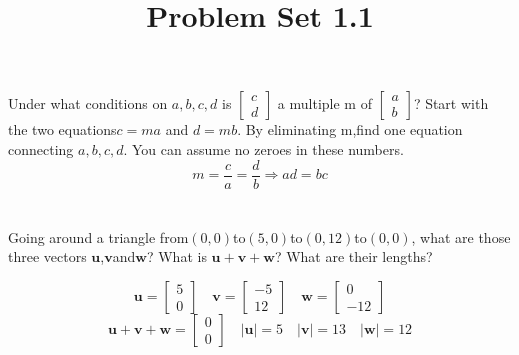 \documentclass{article}
\title{Problem Set 1.1}
\author{}
\date{}
\begin{document}
\maketitle
\section{}
Under what conditions on $a,b,c,d$ is 
$\begin{bmatrix}
c\\d    
\end{bmatrix}$
a multiple m of
$\begin{bmatrix}
a\\b    
\end{bmatrix}$?
Start with the two equations$c=ma$ and $d=mb$.
By eliminating m,find one equation connecting $a,b,c,d$.
You can assume no zeroes in these numbers.
\[m=\frac{c}{a}=\frac{d}{b}
\Rightarrow ad=bc\]

\section{}
Going around a triangle from$(0,0)$to$(5,0)$to$(0,12)$to$(0,0)$,
what are those three vectors $\mathbf{u}$,$\mathbf{v}$and$\mathbf{w}$?
What is $\mathbf{u}+\mathbf{v}+\mathbf{w}$?
What are their lengths?

\[\mathbf{u}= \begin{bmatrix}
5\\0    
\end{bmatrix}\quad
\mathbf{v}= \begin{bmatrix}
-5\\12
\end{bmatrix}\quad
\mathbf{w}= \begin{bmatrix}
0\\-12
\end{bmatrix}
\]
\[\mathbf{u}+\mathbf{v}+\mathbf{w}= \begin{bmatrix}
0\\0
\end{bmatrix}
\quad
|\mathbf{u}|=5\quad
|\mathbf{v}|=13\quad
|\mathbf{w}|=12
\]
\end{document}

